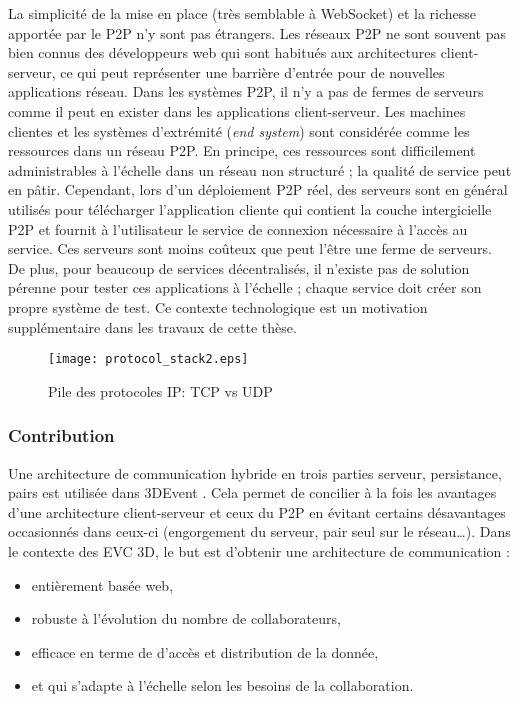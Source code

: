 La simplicité de la mise en place (très semblable à WebSocket) et la 
richesse apportée par le \gls{P2P} n'y sont pas étrangers.
Les réseaux \gls{P2P} ne sont souvent pas bien connus des 
développeurs web qui sont habitués aux architectures client-serveur, ce 
qui peut représenter une barrière d'entrée pour de nouvelles applications 
réseau. 
Dans les systèmes \gls{P2P}, il n'y a pas de fermes de serveurs comme 
il peut en exister dans les applications client-serveur. 
Les machines clientes et les systèmes d'extrémité (\textit{end system}) 
sont considérée comme \og les ressources\fg{} dans un réseau 
\gls{P2P}. 
En principe, ces ressources sont difficilement administrables à l'échelle 
dans un réseau non structuré ; la qualité de service peut en pâtir.
Cependant, lors d'un déploiement \gls{P2P} réel, des serveurs sont en 
général utilisés pour télécharger l'application cliente qui contient la couche 
intergicielle \gls{P2P} et fournit à l'utilisateur le service de connexion 
nécessaire à l'accès au service. 
Ces serveurs sont moins coûteux que peut l'être une ferme de serveurs. 
De plus, pour beaucoup de services décentralisés, il n'existe 
pas de solution pérenne pour tester ces applications à l'échelle ; chaque 
service doit créer son propre système de test. 
Ce contexte technologique est un motivation supplémentaire dans les travaux de 
cette thèse.

\begin{figure}[th]
	\centering
	\texttt{[image: protocol\_stack2.eps]}
	\caption{Pile des protocoles IP: TCP vs UDP}
	\label{fig:protocolstack}
\end{figure}

\subsubsection{Contribution}
Une architecture de communication hybride en trois parties serveur, persistance, 
pairs est utilisée dans 3DEvent \cite{Desprat2016}. Cela permet de concilier à la 
fois les avantages d'une architecture client-serveur et ceux du \gls{P2P} en évitant 
certains désavantages occasionnés dans ceux-ci (engorgement du serveur, pair 
seul sur le réseau\dots). Dans le contexte des \gls{EVC} \gls{3D}, le but 
est d'obtenir une architecture de communication : 

\begin{itemize}
	\item entièrement basée web, 
	\item robuste à l'évolution du nombre de collaborateurs, 
	\item efficace en terme de d'accès et distribution de la donnée, 
	\item et qui s'adapte à l'échelle selon les besoins de la collaboration.
\end{itemize}

